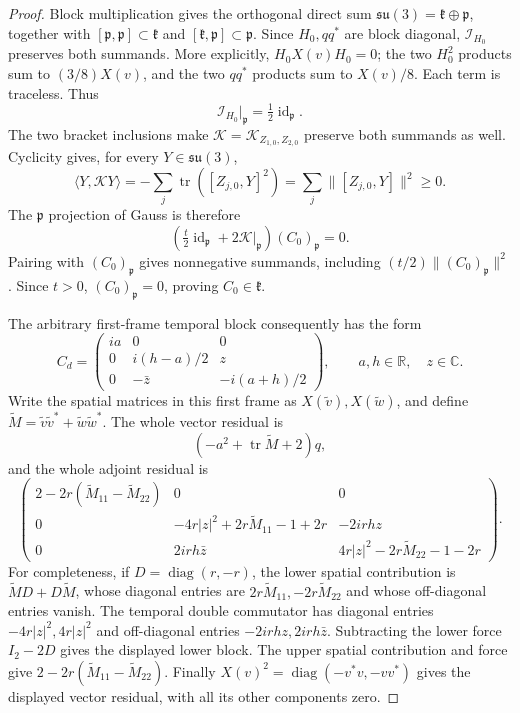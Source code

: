 \begin{proof}
Block multiplication gives the orthogonal direct sum
$\mathfrak{su}(3)=\mathfrak k\oplus\mathfrak p$, together with
$[\mathfrak p,\mathfrak p]\subset\mathfrak k$ and
$[\mathfrak k,\mathfrak p]\subset\mathfrak p$.
Since $H_0,qq^*$ are block diagonal, $\mathcal I_{H_0}$ preserves
both summands. More explicitly, $H_0X(v)H_0=0$; the two $H_0^2$
products sum to $(3/8)X(v)$, and the two $qq^*$ products sum
to $X(v)/8$. Each term is traceless. Thus
\[
 \mathcal I_{H_0}|_{\mathfrak p}
 =\tfrac12\operatorname{id}_{\mathfrak p}.
\]
The two bracket inclusions make $\mathcal K=\mathcal K_{Z_{1,0},Z_{2,0}}$
preserve both summands as well. Cyclicity gives, for every
$Y\in\mathfrak{su}(3)$,
\[
 \langle Y,\mathcal KY\rangle
 =-\sum_j\operatorname{tr}([Z_{j,0},Y]^2)
 =\sum_j\|[Z_{j,0},Y]\|^2\ge0.
\]
The $\mathfrak p$ projection of Gauss is therefore
\[
 (\tfrac t2\operatorname{id}_{\mathfrak p}
       +2\mathcal K|_{\mathfrak p})(C_0)_{\mathfrak p}=0.
\]
Pairing with $(C_0)_{\mathfrak p}$ gives nonnegative summands,
including $(t/2)\|(C_0)_{\mathfrak p}\|^2$. Since $t>0$,
$(C_0)_{\mathfrak p}=0$, proving $C_0\in\mathfrak k$.

The arbitrary first-frame temporal block consequently has the form
\[
 C_d=\begin{pmatrix}
 ia&0&0\\0&i(h-a)/2&z\\0&-\bar z&-i(a+h)/2
 \end{pmatrix},\qquad a,h\in\mathbb R,\quad z\in\mathbb C.
\]
Write the spatial matrices in this first frame as
$X(\widetilde v),X(\widetilde w)$, and define
$\widetilde M=\widetilde v\widetilde v^*
                +\widetilde w\widetilde w^*$.
The whole vector residual is
\[
 (-a^2+\operatorname{tr}\widetilde M+2)q,
\]
and the whole adjoint residual is
\[
 \begin{pmatrix}
 2-2r(\widetilde M_{11}-\widetilde M_{22})&0&0\\
 0&-4r|z|^2+2r\widetilde M_{11}-1+2r&-2irhz\\
 0&2irh\bar z&4r|z|^2-2r\widetilde M_{22}-1-2r
 \end{pmatrix}.
\]
For completeness, if $D=\operatorname{diag}(r,-r)$, the lower
spatial contribution is $\widetilde MD+D\widetilde M$, whose
diagonal entries are $2r\widetilde M_{11},-2r\widetilde M_{22}$
and whose off-diagonal entries vanish. The temporal double
commutator has diagonal entries $-4r|z|^2,4r|z|^2$ and
off-diagonal entries $-2irhz,2irh\bar z$.
Subtracting the lower force $I_2-2D$ gives the displayed lower block.
The upper spatial contribution and force give
$2-2r(\widetilde M_{11}-\widetilde M_{22})$.
Finally $X(v)^2=\operatorname{diag}(-v^*v,-vv^*)$ gives the
displayed vector residual, with all its other components zero.


\end{proof}
